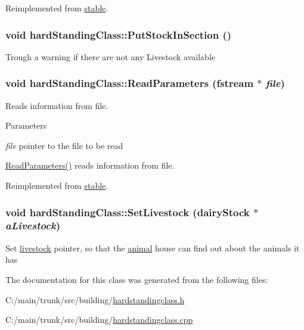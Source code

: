 Reimplemented from \hyperlink{classstable_a2911ffc8041366d46674bf48a6b4d6c5}{stable}.\hypertarget{classhard_standing_class_af7a8835dd1b368aa443af8f9ad7fd677}{
\subsubsection[{PutStockInSection}]{\setlength{\rightskip}{0pt plus 5cm}void hardStandingClass::PutStockInSection ()}}
\label{classhard_standing_class_af7a8835dd1b368aa443af8f9ad7fd677}
Trough a warning if there are not any Livestock available \hypertarget{classhard_standing_class_a87b03d8140b5d5913fc8e79cc8229410}{
\subsubsection[{ReadParameters}]{\setlength{\rightskip}{0pt plus 5cm}void hardStandingClass::ReadParameters (fstream $\ast$ {\em file})}}
\label{classhard_standing_class_a87b03d8140b5d5913fc8e79cc8229410}


Reads information from file. 
\begin{DoxyParams}{Parameters}
\item[{\em file}]pointer to the file to be read\end{DoxyParams}
\hyperlink{classhard_standing_class_a87b03d8140b5d5913fc8e79cc8229410}{ReadParameters()} reads information from file. 

Reimplemented from \hyperlink{classstable_ab0195f308a48e008485cf5d04955a741}{stable}.\hypertarget{classhard_standing_class_aa54411fdc0bdbf3e4cb043ca1b0ce765}{
\subsubsection[{SetLivestock}]{\setlength{\rightskip}{0pt plus 5cm}void hardStandingClass::SetLivestock ({\bf dairyStock} $\ast$ {\em aLivestock})}}
\label{classhard_standing_class_aa54411fdc0bdbf3e4cb043ca1b0ce765}
Set \hyperlink{classlivestock}{livestock} pointer, so that the \hyperlink{classanimal}{animal} house can find out about the animals it has 

The documentation for this class was generated from the following files:\begin{DoxyCompactItemize}
\item 
C:/main/trunk/src/building/\hyperlink{hardstandingclass_8h}{hardstandingclass.h}\item 
C:/main/trunk/src/building/\hyperlink{hardstandingclass_8cpp}{hardstandingclass.cpp}\end{DoxyCompactItemize}

